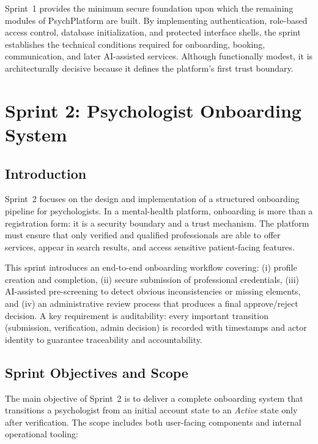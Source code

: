 \documentclass[a4paper,12pt]{report}
\begin{document}
Sprint~1 provides the minimum secure foundation upon which the remaining modules of PsychPlatform are built. By implementing authentication, role-based access control, database initialization, and protected interface shells, the sprint establishes the technical conditions required for onboarding, booking, communication, and later AI-assisted services. Although functionally modest, it is architecturally decisive because it defines the platform's first trust boundary.
\clearpage
\chapter{Sprint 2: Psychologist Onboarding System}
\label{chap:sprint2-onboarding}

\section*{Introduction}
{}
{}

Sprint~2 focuses on the design and implementation of a structured onboarding
pipeline for psychologists. In a mental-health platform, onboarding is more
than a registration form: it is a security boundary and a trust mechanism. The
platform must ensure that only verified and qualified professionals are able to
offer services, appear in search results, and access sensitive patient-facing
features.

This sprint introduces an end-to-end onboarding workflow covering: (i) profile
creation and completion, (ii) secure submission of professional credentials,
(iii) AI-assisted pre-screening to detect obvious inconsistencies or missing
elements, and (iv) an administrative review process that produces a final
approve/reject decision. A key requirement is auditability: every important
transition (submission, verification, admin decision) is recorded with
timestamps and actor identity to guarantee traceability and accountability.

\section{Sprint Objectives and Scope}
\label{sec:sprint2-objectives}

The main objective of Sprint~2 is to deliver a complete onboarding system that
transitions a psychologist from an initial account state to an \emph{Active}
state only after verification. The scope includes both user-facing components
and internal operational tooling:
\end{document}
